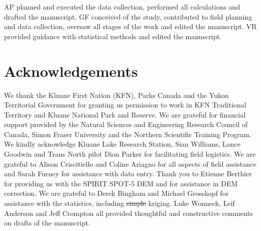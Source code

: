 \documentclass[review,oneside, letterpaper]{igs} %
\providecommand{\DIFadd}[1]{{\protect\color{blue}\uwave{#1}}} %
\providecommand{\DIFdel}[1]{{\protect\color{red}\sout{#1}}}                      %
\providecommand{\DIFaddbegin}{} %
\providecommand{\DIFaddend}{} %
\providecommand{\DIFdelbegin}{} %
\providecommand{\DIFdelend}{} %
\newcommand{\DIFscaledelfig}{0.5}
\newlength{\DIFdelgraphicswidth} %
\newlength{\DIFdelgraphicsheight} %
\newcommand{\DIFaddincludegraphics}[2][]{{\color{blue}\fbox{\DIFOincludegraphics[#1]{#2}}}} %
\newcommand{\DIFdelincludegraphics}[2][]{%
\sbox{\DIFdelgraphicsbox}{\DIFOincludegraphics[#1]{#2}}%
\settoboxwidth{\DIFdelgraphicswidth}{\DIFdelgraphicsbox} %
\settoboxtotalheight{\DIFdelgraphicsheight}{\DIFdelgraphicsbox} %
\scalebox{\DIFscaledelfig}{%
\parbox[b]{\DIFdelgraphicswidth}{\usebox{\DIFdelgraphicsbox}\\[-\baselineskip] \rule{\DIFdelgraphicswidth}{0em}}\llap{\resizebox{\DIFdelgraphicswidth}{\DIFdelgraphicsheight}{%
\setlength{\unitlength}{\DIFdelgraphicswidth}%
\begin{picture}(1,1)%
\thicklines\linethickness{2pt} %
{\color[rgb]{1,0,0}\put(0,0){\framebox(1,1){}}}%
{\color[rgb]{1,0,0}\put(0,0){\line( 1,1){1}}}%
{\color[rgb]{1,0,0}\put(0,1){\line(1,-1){1}}}%
\end{picture}%
}\hspace*{3pt}}} %
} %
\DeclareRobustCommand{\DIFaddbegin}{\DIFOaddbegin \let\includegraphics\DIFaddincludegraphics} %
\DeclareRobustCommand{\DIFaddend}{\DIFOaddend \let\includegraphics\DIFOincludegraphics} %
\DeclareRobustCommand{\DIFdelbegin}{\DIFOdelbegin \let\includegraphics\DIFdelincludegraphics} %
\DeclareRobustCommand{\DIFdelend}{\DIFOaddend \let\includegraphics\DIFOincludegraphics} %
\begin{document}
AP planned and executed the data collection, performed all calculations and drafted the manuscript. GF conceived of the study, contributed to field planning and data collection, oversaw all stages of the work and edited the manuscript. VR provided guidance with statistical methods and edited the manuscript.

\section{Acknowledgements}

We thank the Kluane First Nation (KFN), Parks Canada and the Yukon Territorial Government for granting us permission to work in KFN Traditional Territory and Kluane National Park and Reserve. We are grateful for financial support provided by the Natural Sciences and Engineering Research Council of  Canada, Simon Fraser University and the Northern Scientific  Training  Program. We kindly acknowledge Kluane Lake Research Station, Sian Williams, Lance Goodwin and Trans North pilot Dion Parker for facilitating field logistics. We are grateful to Alison Criscitiello and Coline Ariagno for all aspects of field assistance and Sarah Furney for assistance with data entry. Thank you to Etienne Berthier for providing us with the SPIRIT SPOT-5 DEM and for assistance in DEM correction. We are grateful to Derek Bingham and Michael Grosskopf for assistance with the statistics, including \DIFdelbegin \DIFdel{simple }\DIFdelend \DIFaddbegin \DIFadd{ordinary }\DIFaddend kriging. Luke Wonneck, Leif Anderson and Jeff Crompton all provided thoughtful and constructive comments on drafts of the manuscript.


%
%
%



\end{document}
